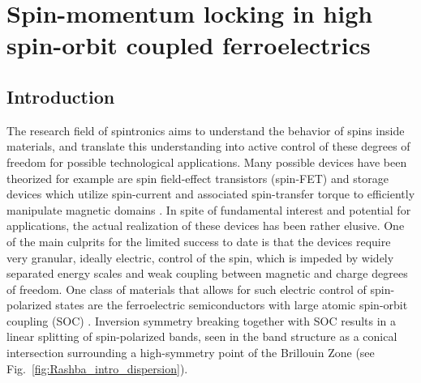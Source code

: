 \newcommand{\unkr}{$u_n(\bm{k}, \bm{r})$}
\newcommand{\Unkr}{u_n(\bm{k}, \bm{r})}
\newcommand{\eikr}{$e^{i\bm{k}\cdot\bm{r}}$}
\newcommand{\Eikr}{e^{i\bm{k}\cdot\bm{r}}}
\chapter{Spin-momentum locking in high spin-orbit coupled ferroelectrics}
\section{Introduction}
%
The research field of spintronics aims to understand the behavior of spins inside materials, and translate this understanding into active control of these degrees of freedom for possible technological applications.
Many possible devices have been theorized for example are spin field-effect transistors (spin-FET)\cite{Datta1990} and storage devices which utilize spin-current and associated spin-transfer torque to efficiently manipulate magnetic domains \cite{Kent2015,Jungwirth2016}. In spite of fundamental interest and potential for applications, the actual realization of these devices has been rather elusive.
One of the main culprits for the limited success to date is that the devices require very granular, ideally electric, control of the spin, which is impeded by widely separated energy scales and weak coupling between magnetic and charge degrees of freedom.
One class of materials that allows for such electric control of spin-polarized states are the ferroelectric semiconductors with large atomic spin-orbit coupling (SOC) \cite{DiSante2013,Ishizaka2011,Kim2014}.
Inversion symmetry breaking together with SOC results in a linear splitting of spin-polarized bands, seen in the band structure as a conical intersection surrounding a high-symmetry point of the Brillouin Zone (see Fig.~\ref{fig:Rashba_intro_dispersion}).
